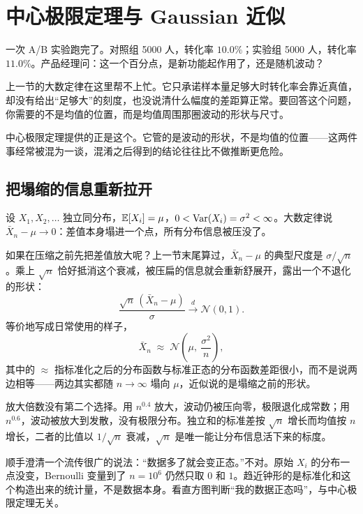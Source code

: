 \section{中心极限定理与 Gaussian 近似}
\label{sec:05-Probability/08-Limit-Theorems/03}

一次 A/B 实验跑完了。对照组 5000 人，转化率 \(10.0\%\)；实验组 5000 人，转化率 \(11.0\%\)。产品经理问：这一个百分点，是新功能起作用了，还是随机波动？

上一节的大数定律在这里帮不上忙。它只承诺样本量足够大时转化率会靠近真值，却没有给出``足够大''的刻度，也没说清什么幅度的差距算正常。要回答这个问题，你需要的不是均值的位置，而是均值周围那圈波动的形状与尺寸。

中心极限定理提供的正是这个。它管的是波动的形状，不是均值的位置——这两件事经常被混为一谈，混淆之后得到的结论往往比不做推断更危险。

\subsection{把塌缩的信息重新拉开}

设 \(X_1,X_2,\ldots\) 独立同分布，\(\mathbb{E}[X_i]=\mu\)，\(0<\operatorname{Var}(X_i)=\sigma^2<\infty\)。大数定律说 \(\bar X_n-\mu\to0\)：差值本身塌进一个点，所有分布信息被压没了。

如果在压缩之前先把差值放大呢？上一节末尾算过，\(\bar X_n-\mu\) 的典型尺度是 \(\sigma/\sqrt n\)。乘上 \(\sqrt n\) 恰好抵消这个衰减，被压扁的信息就会重新舒展开，露出一个不退化的形状：
\[
\frac{\sqrt n\,(\bar X_n-\mu)}{\sigma}\xrightarrow{d}\mathcal N(0,1).
\]
等价地写成日常使用的样子，
\[
\bar X_n\;\approx\;\mathcal N\!\left(\mu,\ \frac{\sigma^2}{n}\right),
\]
其中的 \(\approx\) 指标准化之后的分布函数与标准正态的分布函数差距很小，而不是说两边相等——两边其实都随 \(n\to\infty\) 塌向 \(\mu\)，近似说的是塌缩之前的形状。

放大倍数没有第二个选择。用 \(n^{0.4}\) 放大，波动仍被压向零，极限退化成常数；用 \(n^{0.6}\)，波动被放大到发散，没有极限分布。独立和的标准差按 \(\sqrt n\) 增长而均值按 \(n\) 增长，二者的比值以 \(1/\sqrt n\) 衰减，\(\sqrt n\) 是唯一能让分布信息活下来的标度。

顺手澄清一个流传很广的说法：``数据多了就会变正态。''不对。原始 \(X_i\) 的分布一点没变，Bernoulli 变量到了 \(n=10^6\) 仍然只取 \(0\) 和 \(1\)。趋近钟形的是标准化和这个构造出来的统计量，不是数据本身。看直方图判断``我的数据正态吗''，与中心极限定理无关。

